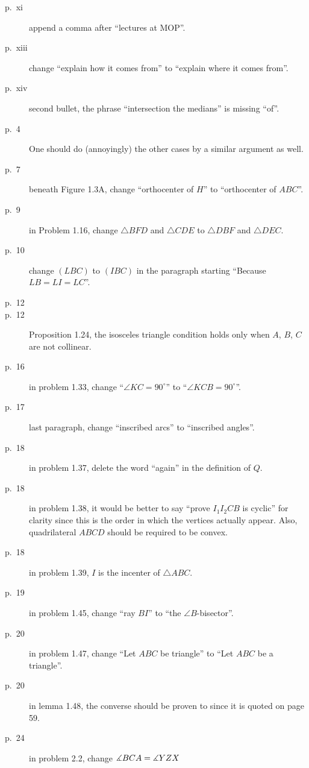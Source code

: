 \documentclass[11pt]{scrartcl}
\begin{document}
\begin{description}

\item[p.\  xi] append a comma after ``lectures at MOP''.
\item[p.\  xiii] change ``explain how it comes from'' to ``explain where it comes from''.
\item[p.\  xiv] second bullet, the phrase ``intersection the medians'' is missing ``of''.
\item[p.\   4] 
  One should do (annoyingly) the other cases by a similar argument as well.
\item[p.\   7] beneath Figure 1.3A, change ``orthocenter of $H$'' to ``orthocenter of $ABC$''.
\item[p.\   9] in Problem 1.16, change $\triangle BFD$ and $\triangle CDE$
  to $\triangle DBF$ and $\triangle DEC$.
\item[p.\  10] change $(LBC)$ to $(IBC)$ in the paragraph starting ``Because $LB=LI=LC$''.
\item[p.\  12] 
\item[p.\  12] Proposition 1.24, the isosceles triangle condition holds
  only when $A$, $B$, $C$ are not collinear.
\item[p.\  16] in problem 1.33, change ``$\angle KC=90^{\circ}$'' to ``$\angle KCB=90^{\circ}$''.
\item[p.\  17] last paragraph, change ``inscribed arcs'' to ``inscribed angles''.
\item[p.\  18] in problem 1.37, delete the word ``again'' in the definition of $Q$.
\item[p.\  18] in problem 1.38, it would be better to say
  ``prove $I_1 I_2 C B$ is cyclic'' for clarity
  since this is the order in which the vertices actually appear.
  Also, quadrilateral $ABCD$ should be required to be convex.
\item[p.\  18] in problem 1.39, $I$ is the incenter of $\triangle ABC$.
\item[p.\  19] in problem 1.45, change ``ray $BI$'' to ``the $\angle B$-bisector''.
\item[p.\  20] in problem 1.47, change ``Let $ABC$ be triangle'' to ``Let $ABC$ be a triangle''.
\item[p.\  20] in lemma 1.48, the converse should be proven to since it is quoted on page 59.
\item[p.\  24] in problem 2.2, change $\measuredangle BCA = \measuredangle YZX$

\end{description}
\end{document}
